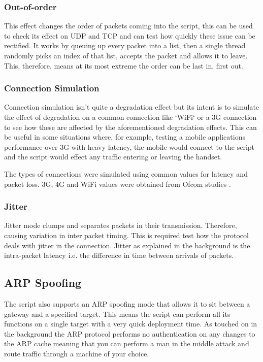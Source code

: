 \subsubsection{Out-of-order}
This effect changes the order of packets coming into the script, this can be used to check its effect on UDP and TCP and can test how quickly these issue can be rectified. It works by queuing up every packet into a list, then a single thread randomly picks an index of that list, accepts the packet and allows it to leave. This, therefore, means at its most extreme the order can be last in, first out.

\subsubsection{Connection Simulation}
Connection simulation isn't quite a degradation effect but its intent is to simulate the effect of degradation on a common connection like `WiFi` or a 3G connection to see how these are affected by the aforementioned degradation effects. This can be useful in some situations where, for example, testing a mobile applications performance over 3G with heavy latency, the mobile would connect to the script and the script would effect any traffic entering or leaving the handset.

The types of connections were simulated using common values for latency and packet loss. 3G, 4G and WiFi values were obtained from Ofcom studies \citep{ofcom} \citep{ofcomMobile}.

\subsubsection{Jitter}
Jitter mode clumps and separates packets in their transmission. Therefore, causing variation in inter packet timing. This is required test how the protocol deals with jitter in the connection. Jitter as explained in the background is the intra-packet latency i.e. the difference in time between arrivals of packets.

\subsection{ARP Spoofing}
\label{ref:arpSpoof}
The script also supports an ARP spoofing mode that allows it to sit between a gateway and a specified target. This means the script can perform all its functions on a single target with a very quick deployment time. As touched on in the background the ARP protocol performs no authentication on any changes to the ARP cache meaning that you can perform a man in the middle attack and route traffic through a machine of your choice.

